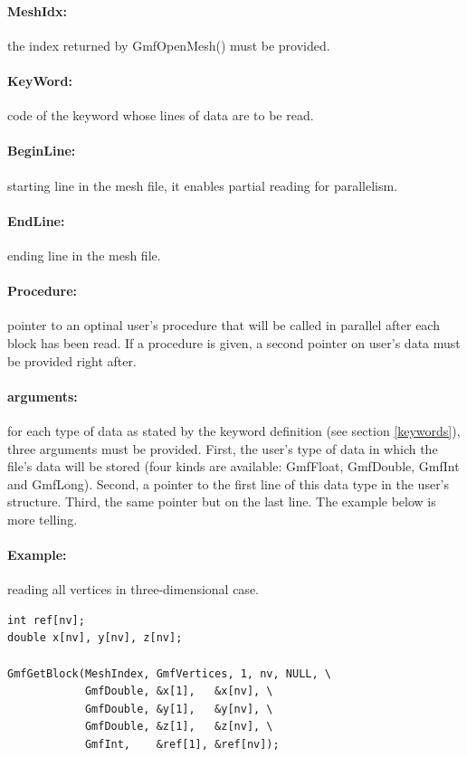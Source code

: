 \documentclass[a4paper,12pt]{article}
\begin{document}
\paragraph{MeshIdx:}
the index returned by GmfOpenMesh() must be provided.

\paragraph{KeyWord:} code of the keyword whose lines of data are to be read.

\paragraph{BeginLine:} starting line in the mesh file, it enables partial reading for parallelism.

\paragraph{EndLine:} ending line in the mesh file.

\paragraph{Procedure:} pointer to an optinal user's procedure that will be called in  parallel after each block has been read. If a procedure is given, a second pointer on user's data must be provided right after.

\paragraph{arguments:} for each type of data as stated by the keyword definition (see section \ref{keywords}), three arguments must be provided. First, the user's type of data in which the file's data will be stored (four kinds are available: GmfFloat, GmfDouble, GmfInt and GmfLong). Second, a pointer to the first line of this data type in the user's structure. Third, the same pointer but on the last line. The example below is more telling.

\paragraph{Example:} reading all vertices in three-dimensional case.

\begin{tt}
\begin{verbatim}
int ref[nv];
double x[nv], y[nv], z[nv];

GmfGetBlock(MeshIndex, GmfVertices, 1, nv, NULL, \
            GmfDouble, &x[1],   &x[nv], \
            GmfDouble, &y[1],   &y[nv], \
            GmfDouble, &z[1],   &z[nv], \
            GmfInt,    &ref[1], &ref[nv]);
\end{verbatim}
\end{tt}
\normalfont
\end{document}
